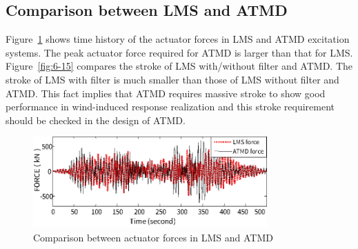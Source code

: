 \subsection{Comparison between LMS and ATMD}

Figure~\ref{fig:6-14} shows time history of the actuator forces in LMS and ATMD excitation systems. The peak actuator force required for ATMD is larger than that for LMS. Figure~\ref{fig:6-15} compares the stroke of LMS with/without filter and ATMD. The stroke of LMS with filter is much smaller than those of LMS without filter and ATMD. This fact implies that ATMD requires massive stroke to show good performance in wind-induced response realization and this stroke requirement should be checked in the design of ATMD.

\begin{figure}[ht]
\centering
\includegraphics[width=0.8\textwidth] {figure/6-14.eps}
\caption{Comparison between actuator forces in LMS and ATMD}
\label{fig:6-14}
\end{figure}

